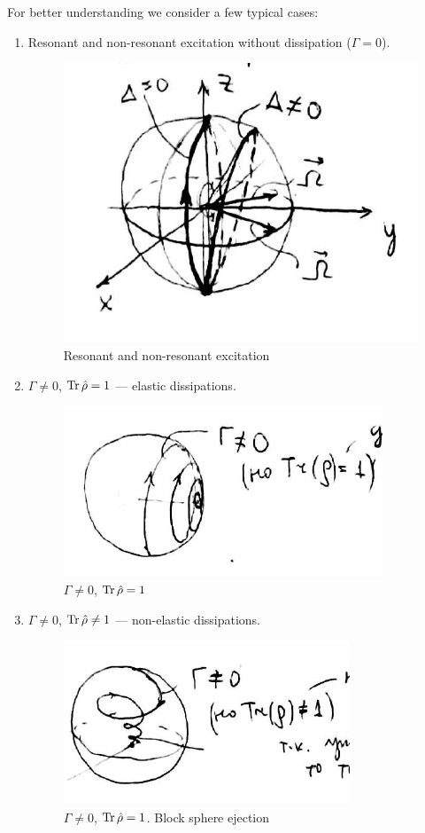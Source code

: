 For better understanding we consider a few typical cases: 
\begin{enumerate}
	\item Resonant and non-resonant excitation without dissipation ($\Gamma = 0$). 
	\begin{figure}[h!]
		\centering
		\includegraphics[width=0.7\linewidth]{fig/L5/bloch1}
		\caption{Resonant and non-resonant excitation}
		\label{fig:bloch1}
	\end{figure}
	\item $\Gamma \neq 0$, $\operatorname{Tr} \hat{\rho} = 1$ --- elastic dissipations.
	\begin{figure}[h!]
		\centering
		\includegraphics[width=0.4\linewidth]{fig/L5/gamma_ne_nol_1}
		\caption{$\Gamma \neq 0$, $\operatorname{Tr} \hat{\rho} = 1$}
		\label{fig:gammanenol1}
	\end{figure}
	\item $\Gamma \neq 0$, $\operatorname{Tr} \hat{\rho} \neq 1$ --- non-elastic dissipations. 
	\begin{figure}[h!]
		\centering
		\includegraphics[width=0.4\linewidth]{fig/L5/gamma_ne_nol}
		\caption{$\Gamma \neq 0$, $\operatorname{Tr} \hat{\rho} = 1$. Block sphere ejection}
		\label{fig:gammanenol}
	\end{figure}
	
	
\end{enumerate}
